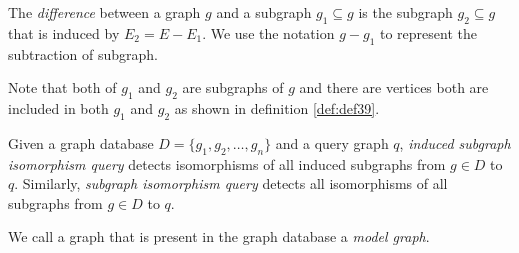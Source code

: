 \begin{definition}
\label{def:def310}
The \textit{difference} between a graph $g$ and a subgraph $g_1 \subseteq g$ is the subgraph $g_2 \subseteq g$ that is induced by $E_2 =E -E_1$.
We use the notation $g-g_1$ to represent the subtraction of subgraph.
\end{definition}
Note that both of $g_1$ and $g_2$ are subgraphs of $g$ and there are vertices both are included in both  $g_1$ and $g_2$  as shown in definition \ref{def:def39}.


\begin{definition}
\label{def:def311}
Given a graph database $D= \{ g_1,g_2,\dots,g_n \}$ and a query graph $q$,
\textit{induced subgraph isomorphism query} detects isomorphisms of all induced subgraphs from $g \in D$ to $q$.
Similarly, \textit{subgraph isomorphism query} detects all isomorphisms of all subgraphs from $g \in D$ to $q$.
\end{definition}

We call a graph that is present in the graph database a \textit{model graph}. 
